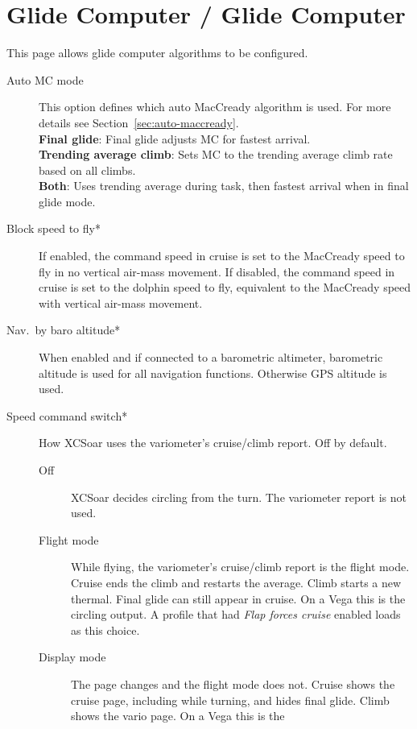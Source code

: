 \section{Glide Computer / Glide Computer}\label{sec:final-glide}\label{conf:final-glide}	

This page allows glide computer algorithms to be configured.

\begin{description}
\item[Auto MC mode]  This option defines which auto MacCready algorithm is used.
  For more details see Section~\ref{sec:auto-maccready}. \\
  {\bf Final glide}: Final glide adjusts MC for fastest arrival.
 \\
  {\bf Trending average climb}: Sets MC to the trending average climb rate based 
  on all climbs. \\
  {\bf Both}: Uses trending average during task, then fastest arrival when in final 
  glide mode.
\item[Block speed to fly*]  If enabled, the command speed in cruise
  is set to the MacCready speed to fly in no vertical air-mass movement.
  If disabled, the command speed in cruise is set to the dolphin speed to fly,
  equivalent to the MacCready speed with vertical air-mass movement.
\item[Nav.\ by baro altitude*]  When enabled and if connected to a barometric
  altimeter, barometric altitude is used for all navigation functions. Otherwise
  GPS altitude is used.
\item[Speed command switch*]
  How XCSoar uses the variometer's cruise/climb report.  Off by default.
  \begin{description}
  \item[Off] XCSoar decides circling from the turn.  The variometer
    report is not used.
  \item[Flight mode] While flying, the variometer's cruise/climb report
    is the flight mode.  Cruise ends the climb and restarts the average.
    Climb starts a new thermal.  Final glide can still appear in cruise.
    On a Vega this is the circling output.  A profile that had
    \emph{Flap forces cruise} enabled loads as this choice.
  \item[Display mode] The page changes and the flight mode does not.
    Cruise shows the cruise page, including while turning, and hides
    final glide.  Climb shows the vario page.  On a Vega this is the

\end{description}
\end{description}
